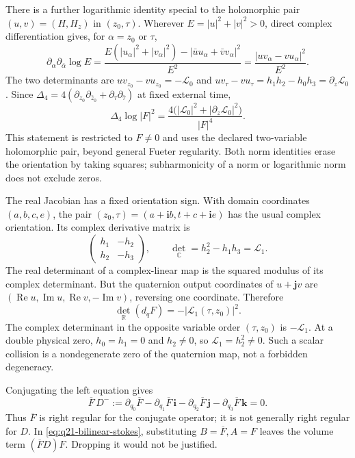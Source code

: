 \documentclass[11pt]{article}
\numberwithin{equation}{section}
\theoremstyle{definition}
\theoremstyle{remark}
\newcommand{\Lag}{\mathscr L}
\begin{document}
There is a further logarithmic identity special to the holomorphic pair
\((u,v)=(H,H_z)\) in \((z_0,\tau)\). Wherever
\(E=|u|^2+|v|^2>0\), direct complex differentiation gives, for
\(\alpha=z_0\) or \(\tau\),
\[
 \partial_\alpha\partial_{\bar\alpha}\log E
 =\frac{E(|u_\alpha|^2+|v_\alpha|^2)
       -|\bar uu_\alpha+\bar vv_\alpha|^2}{E^2}
 =\frac{|uv_\alpha-vu_\alpha|^2}{E^2}.
\]
The two determinants are
\(uv_{z_0}-vu_{z_0}=-\Lag_0\) and
\(uv_\tau-vu_\tau=h_1h_2-h_0h_3=\partial_z\Lag_0\).
Since
\(\Delta_4=4(\partial_{z_0}\partial_{\bar z_0}
 +\partial_\tau\partial_{\bar\tau})\) at fixed external time,
\begin{equation}
 \boxed{\Delta_4\log|F|^2
 =\frac{4\bigl(|\Lag_0|^2+
       |\partial_z\Lag_0|^2\bigr)}{|F|^4}.}
 \label{eq:q21-lognorm-laplacian}
\end{equation}
This statement is restricted to \(F\ne0\) and uses the declared
two-variable holomorphic pair, beyond general Fueter regularity.
Both norm identities erase the orientation by taking squares;
subharmonicity of a norm or logarithmic norm does not exclude zeros.

The real Jacobian has a fixed orientation sign. With domain coordinates
\((a,b,c,e)\), the pair \((z_0,\tau)=(a+\mathbf ib,t+c+\mathbf ie)\)
has the usual complex orientation. Its complex derivative matrix is
\[
 \begin{pmatrix}h_1&-h_2\\h_2&-h_3\end{pmatrix},
 \qquad\det_{\mathbb C}=h_2^2-h_1h_3=\Lag_1.
\]
The real determinant of a complex-linear map is the squared modulus of
its complex determinant. But the quaternion output coordinates of
\(u+\mathbf jv\) are
\((\operatorname{Re}u,\operatorname{Im}u,
  \operatorname{Re}v,-\operatorname{Im}v)\), reversing one coordinate.
Therefore
\begin{equation}
 \det_{\mathbb R}(d_qF)=-|\Lag_1(\tau,z_0)|^2.
 \label{eq:q21-jacobian}
\end{equation}
The complex determinant in the opposite variable order \((\tau,z_0)\)
is \(-\Lag_1\). At a double physical zero,
\(h_0=h_1=0\) and \(h_2\ne0\), so
\(\Lag_1=h_2^2\ne0\). Such a scalar collision is a
nondegenerate zero of the quaternion map, not a forbidden degeneracy.

Conjugating the left equation gives
\[
 \overline F\,D^-:=
 \partial_{q_0}\overline F
 -\partial_{q_1}\overline F\,\mathbf i
 -\partial_{q_2}\overline F\,\mathbf j
 -\partial_{q_3}\overline F\,\mathbf k=0.
\]
Thus \(\overline F\) is right regular for the conjugate operator;
it is not generally right regular for \(D\).
In \eqref{eq:q21-bilinear-stokes}, substituting
\(B=\overline F,A=F\) leaves the volume term
\((\overline F D)F\). Dropping it would not be justified.
\end{document}
